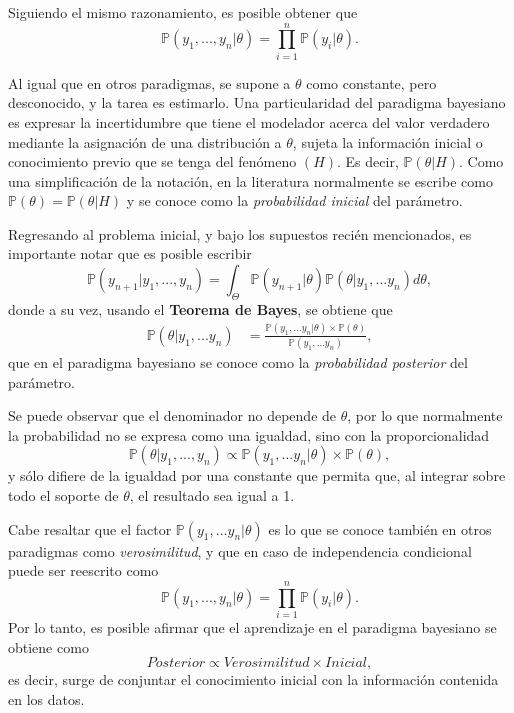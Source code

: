 Siguiendo el mismo razonamiento, es posible obtener que
\begin{equation*}
    \mathbb{P}(y_1,...,y_n | \theta) = \prod_{i=1}^n \mathbb{P}(y_i|\theta). 
\end{equation*}

Al igual que en otros paradigmas, se supone a $\theta$ como constante, pero desconocido, y la tarea es estimarlo. Una particularidad del paradigma bayesiano es expresar la incertidumbre que tiene el modelador acerca del valor verdadero mediante la asignaci\'on de una distribuci\'on a $\theta$, sujeta la informaci\'on inicial o conocimiento previo que se tenga del fen\'omeno $(H)$. Es decir, $\mathbb{P}(\theta|H)$. Como una simplificaci\'on de la notaci\'on, en la literatura normalmente se escribe como $\mathbb{P}(\theta) = \mathbb{P}(\theta|H)$ y se conoce como la \textit{probabilidad inicial} del par\'ametro.

Regresando al problema inicial, y bajo los supuestos reci\'en mencionados, es importante notar que es posible escribir
\begin{equation*}
    \mathbb{P}(y_{n+1} | y_1,...,y_n) =
    \int_{\Theta} 
    \mathbb{P}(y_{n+1}|\theta) \mathbb{P}(\theta|y_1,...y_n)d\theta,
\end{equation*}
donde a su vez, usando el \textbf{Teorema de Bayes}, se obtiene que
\begin{equation*}
\begin{aligned}
    \mathbb{P}(\theta|y_1,...y_n) &=
    \frac{\mathbb{P}(y_1,...y_n|\theta)\times\mathbb{P}(\theta)}
    {\mathbb{P}(y_1,...y_n)},
\end{aligned}
\end{equation*}
que en el paradigma bayesiano se conoce como la \textit{probabilidad posterior} del par\'ametro. 

Se puede observar que el denominador no depende de $\theta$, por lo que normalmente la probabilidad no se expresa como una igualdad, sino con la proporcionalidad
\begin{equation*}
    \mathbb{P}(\theta|y_1,...,y_n) 
    \propto 
    \mathbb{P}(y_1,...y_n|\theta) \times \mathbb{P}(\theta),
\end{equation*}
y s\'olo difiere de la igualdad por una constante que permita que, al integrar sobre todo el soporte de $\theta$, el resultado sea igual a 1.

Cabe resaltar que el factor $\mathbb{P}(y_1,...y_n|\theta)$ es lo que se conoce tambi\'en en otros paradigmas como \textit{verosimilitud}, y que en caso de independencia condicional puede ser reescrito como
\begin{equation*}
    \mathbb{P}(y_1,...,y_n|\theta)  = \prod_{i=1}^n \mathbb{P}(y_i|\theta).
\end{equation*}
Por lo tanto, es posible afirmar que el aprendizaje en el paradigma bayesiano se obtiene como
\begin{equation*}
    Posterior \propto Verosimilitud \times Inicial,
\end{equation*}
es decir, surge de conjuntar el conocimiento inicial con la informaci\'on contenida en los datos.

